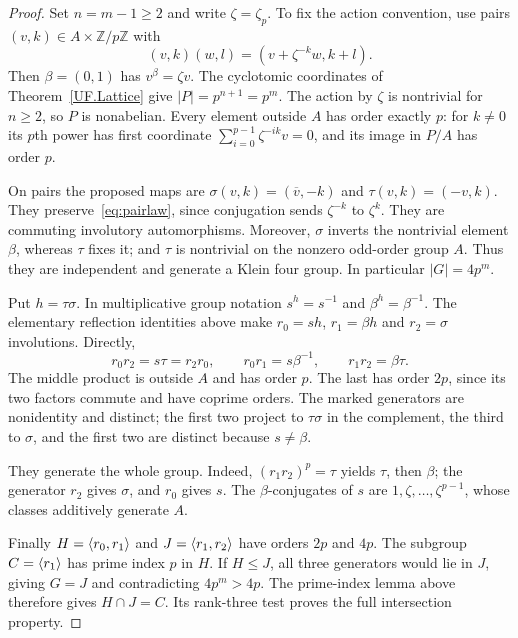 \begin{proof}
Set $n=m-1\geq2$ and write $\zeta=\zeta_p$. To fix the action
convention, use pairs $(v,k)\in A\times\mathbb Z/p\mathbb Z$ with
\begin{equation}\label{eq:pairlaw}
 (v,k)(w,l)=(v+\zeta^{-k}w,k+l).
\end{equation}
Then $\beta=(0,1)$ has $v^\beta=\zeta v$.
The cyclotomic coordinates of Theorem~\ref{UF.Lattice} give $|P|=p^{n+1}=p^m$.
The action by $\zeta$ is nontrivial for $n\geq2$, so $P$ is
nonabelian. Every element outside $A$ has order exactly $p$:
for $k\ne0$ its $p$th power has first coordinate
$\sum_{i=0}^{p-1}\zeta^{-ik}v=0$, and its image in $P/A$ has
order $p$.

On pairs the proposed maps are
$\sigma(v,k)=(\overline v,-k)$ and $\tau(v,k)=(-v,k)$.
They preserve~\eqref{eq:pairlaw}, since conjugation sends
$\zeta^{-k}$ to $\zeta^k$. They are commuting involutory
automorphisms. Moreover, $\sigma$ inverts the nontrivial element
$\beta$, whereas $\tau$ fixes it; and $\tau$ is nontrivial on
the nonzero odd-order group $A$. Thus they are independent and
generate a Klein four group. In particular $|G|=4p^m$.

Put $h=\tau\sigma$. In multiplicative group notation
$s^h=s^{-1}$ and $\beta^h=\beta^{-1}$. The elementary reflection
identities above make $r_0=sh$, $r_1=\beta h$ and
$r_2=\sigma$ involutions. Directly,
\[
 r_0r_2=s\tau=r_2r_0,\qquad
 r_0r_1=s\beta^{-1},\qquad r_1r_2=\beta\tau.
\]
The middle product is outside $A$ and has order $p$.
The last has order $2p$, since its two factors commute and have
coprime orders. The marked generators are nonidentity and distinct;
the first two project to $\tau\sigma$ in the complement, the third
to $\sigma$, and the first two are distinct because $s\ne\beta$.

They generate the whole group. Indeed,
$(r_1r_2)^p=\tau$ yields $\tau$, then $\beta$; the generator
$r_2$ gives $\sigma$, and $r_0$ gives $s$. The
$\beta$-conjugates of $s$ are $1,\zeta,\ldots,\zeta^{p-1}$,
whose classes additively generate $A$.

Finally $H=\langle r_0,r_1\rangle$ and $J=\langle r_1,r_2\rangle$ have
orders $2p$ and $4p$. The subgroup $C=\langle r_1\rangle$ has prime
index $p$ in $H$. If $H\leq J$, all three generators would lie
in $J$, giving $G=J$ and contradicting $4p^m>4p$.
The prime-index lemma above therefore gives $H\cap J=C$.
Its rank-three test proves the full intersection property.
\end{proof}
